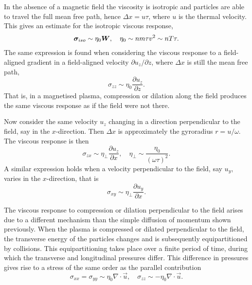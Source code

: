 In the absence of a magnetic field the viscosity is isotropic and particles are able to travel the full mean free path, hence $\Delta x = u \tau$, where $u$ is the thermal velocity. This gives an estimate for the isotropic viscous response,
\begin{equation}
  \label{eq:isotropic_eta_estimate}
  {\bm \sigma}_{iso} \sim \eta_0 {\bm W}, \quad \eta_0 \sim nm\tau v^2 \sim nT \tau.
\end{equation}
The same expression is found when considering the viscous response to a field-aligned gradient in a field-aligned velocity $\partial u_z / \partial z$, where $\Delta x$ is still the mean free path,
\begin{equation}
  \label{eq:parallel_eta_estimate}
\sigma_{zz} \sim \eta_0 \frac{\partial u_z}{\partial z}.
\end{equation}
That is, in a magnetised plasma, compression or dilation along the field produces the same viscous response as if the field were not there.

Now consider the same velocity $u_z$ changing in a direction perpendicular to the field, say in the $x$-direction. Then $\Delta x$ is approximately the gyroradius $r = u/\omega$. The viscous response is then
\begin{equation}
  \label{eq:perp_eta_estimate}
\sigma_{zx} \sim \eta_{\perp} \frac{\partial u_z}{\partial x}, \quad \eta_{\perp} \sim \frac{\eta_0}{(\omega \tau)^2}.
\end{equation}
A similar expression holds when a velocity perpendicular to the field, say $u_y$, varies in the $x$-direction, that is
\begin{equation}
  \label{eq:perp_eta_estimate2}
\sigma_{xy} \sim \eta_{\perp} \frac{\partial u_y}{\partial x}.
\end{equation}

The viscous response to compression or dilation perpendicular to the field arises due to a different mechanism than the simple diffusion of momentum shown previously. When the plasma is compressed or dilated perpendicular to the field, the transverse energy of the particles changes and is subsequently equipartitioned by collisions. This equipartitioning takes place over a finite period of time, during which the transverse and longitudinal pressures differ. This difference in pressures gives rise to a stress of the same order as the parallel contribution
\begin{equation}
  \label{eq:compression_eta_estimate}
\sigma_{xx} = \sigma_{yy} \sim \eta_0 \nabla \cdot \vec{u}, \quad \sigma_{zz} \sim - \eta_0 \nabla \cdot \vec{u}.
\end{equation}

